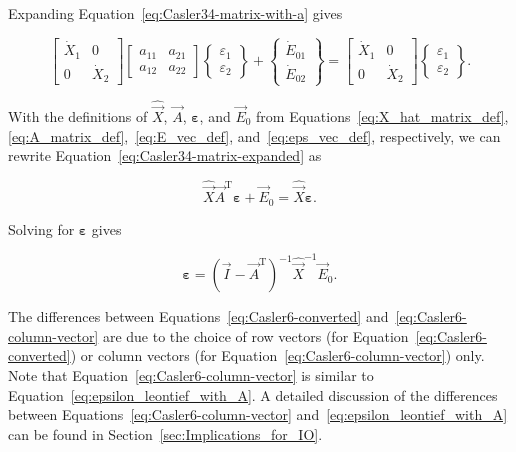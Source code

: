 \noindent{}Expanding Equation~\ref{eq:Casler34-matrix-with-a} gives

\begin{equation} \label{eq:Casler34-matrix-expanded}
	\begin{bmatrix}
		\dot{X}_{1} & 0 \\
		0           & \dot{X}_{2}
	\end{bmatrix}
	\begin{bmatrix}
		a_{11} & a_{21} \\
		a_{12} & a_{22}
	\end{bmatrix}
	\begin{Bmatrix}
		\varepsilon_{1} \\
		\varepsilon_{2}
	\end{Bmatrix}
	+
	\begin{Bmatrix}
		\dot{E}_{01} \\
		\dot{E}_{02}
	\end{Bmatrix}
	=
	\begin{bmatrix}
		\dot{X}_{1} & 0 \\
		0           & \dot{X}_{2}
	\end{bmatrix}
	\begin{Bmatrix}
		\varepsilon_{1} \\
		\varepsilon_{2}
	\end{Bmatrix}.
\end{equation}

\noindent{}With the definitions of $\hat{\vec{X}}$,
$\vec{A}$, $\boldsymbol{\varepsilon}$, and $\vec{E}_{0}$
from Equations~\ref{eq:X_hat_matrix_def},
\ref{eq:A_matrix_def},~\ref{eq:E_vec_def}, 
and~\ref{eq:eps_vec_def}, respectively,
we can rewrite Equation~\ref{eq:Casler34-matrix-expanded} as

\begin{equation}
	\hat{\vec{X}} \vec{A}^{\mathrm{T}} \boldsymbol{\varepsilon}
	+ \vec{E}_{0}
	= \hat{\vec{X}} \boldsymbol{\varepsilon}.
\end{equation}

\noindent{}Solving for $\boldsymbol{\varepsilon}$ gives

\begin{equation} \label{eq:Casler6-column-vector}
	\boldsymbol{\varepsilon}
	= {(\vec{I} - \vec{A}^{\mathrm{T}})}^{-1} 
		\hat{\vec{X}}^{-1} 
		\vec{E}_{0}.
\end{equation}

The differences between Equations~\ref{eq:Casler6-converted}
and~\ref{eq:Casler6-column-vector} are due to the choice 
of row vectors (for Equation~\ref{eq:Casler6-converted})
or column vectors (for Equation~\ref{eq:Casler6-column-vector}) only.
Note that Equation~\ref{eq:Casler6-column-vector} is similar
to Equation~\ref{eq:epsilon_leontief_with_A}.
A detailed discussion of the differences 
between Equations~\ref{eq:Casler6-column-vector} and~\ref{eq:epsilon_leontief_with_A}
can be found in Section~\ref{sec:Implications_for_IO}.


